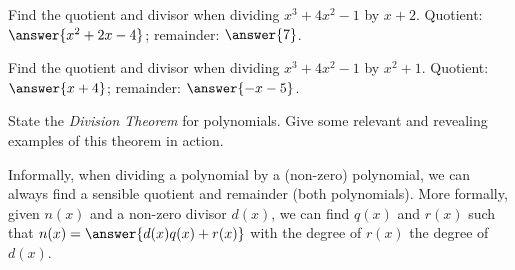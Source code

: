 \documentclass[nooutcomes]{ximera}
\begin{document}
\begin{problem}
Find the quotient and divisor when dividing $x^3+4x^2-1$ by $x+2$.  
Quotient: $\answer{x^2+2x-4}$; remainder: $\answer{7}$. 
\end{problem}

\begin{problem}
Find the quotient and divisor when dividing $x^3+4x^2-1$ by $x^2+1$.  
Quotient: $\answer{x+4}$; remainder: $\answer{-x-5}$. 
\end{problem}


\begin{problem}State the \textit{Division Theorem} for polynomials. Give some
  relevant and revealing examples of this theorem in action.
\begin{freeResponse}
\begin{hint}
Informally, when dividing a polynomial by a (non-zero) polynomial, we can always find a sensible quotient and remainder (both polynomials).  More formally, given $n(x)$ and a non-zero divisor $d(x)$, we can find $q(x)$ and $r(x)$ such that $n(x) = \answer{d(x)q(x)+r(x)}$ with the degree of $r(x)$  the degree of $d(x)$.  
\end{hint}
\end{freeResponse}
\end{problem} 
\end{document}
